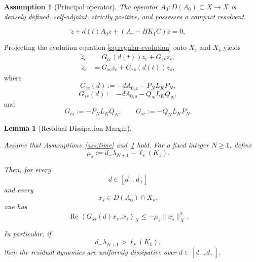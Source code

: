 \documentclass[10pt,a4paper]{amsart}
\newtheorem{assumption}{Assumption}
\newtheorem{lemma}{Lemma}
\begin{document}
\begin{assumption}[Principal operator]
\label{ass:A0}
The operator \(A_0:D(A_0)\subset X\rightarrow X\) is densely defined, self-adjoint, strictly positive, and possesses a compact resolvent.
\end{assumption}

\begin{equation}
\dot z
+
d(t)A_{0}z
+
\left(
A_{r}-BK_{1}C
\right)z
=
0,
\label{eq:regular-evolution}
\end{equation}

Projecting the evolution equation
\eqref{eq:regular-evolution}
onto \(X_c\) and \(X_s\) yields
\begin{equation}
\begin{aligned}
\dot z_c
&=
G_{cc}(d(t))z_c
+
G_{cs}z_s,
\\
\dot z_s
&=
G_{sc}z_c
+
G_{ss}(d(t))z_s,
\end{aligned}
\label{eq:critical-residual-block-system}
\end{equation}
where
\begin{equation}
G_{cc}(d)
:=
-dA_{0,c}
-
P_NL_KP_N,
\label{eq:Gcc-definition}
\end{equation}
\begin{equation}
G_{ss}(d)
:=
-dA_{0,s}
-
Q_NL_KQ_N,
\label{eq:Gss-definition}
\end{equation}
and
\begin{equation}
G_{cs}
:=
-P_NL_KQ_N,
\qquad
G_{sc}
:=
-Q_NL_KP_N.
\label{eq:coupling-blocks}
\end{equation}

\begin{lemma}[Residual Dissipation Margin]
\label{lem:uniform-high-frequency-dissipation}

Assume that Assumptions~\ref{ass:time} and~\ref{ass:A0} hold. For a fixed integer \(N\ge1\), define
\begin{equation}
\mu_s
:=
d_-\lambda_{N+1}
-
\ell_s(K_1).
\label{eq:residual-margin}
\end{equation}

Then, for every
\[
d\in[d_-,d_+]
\]
and every
\[
x_s\in D(A_0)\cap X_s,
\]
one has
\begin{equation}
\operatorname{Re}
\left\langle
G_{ss}(d)x_s,x_s
\right\rangle_X
\le
-\mu_s\|x_s\|_X^2.
\label{eq:uniform-residual-dissipation}
\end{equation}

In particular, if
\begin{equation}
d_-\lambda_{N+1}
>
\ell_s(K_1),
\label{eq:positive-residual-margin}
\end{equation}
then the residual dynamics are uniformly dissipative over \(d\in[d_-,d_+]\).

\end{lemma}
\end{document}
